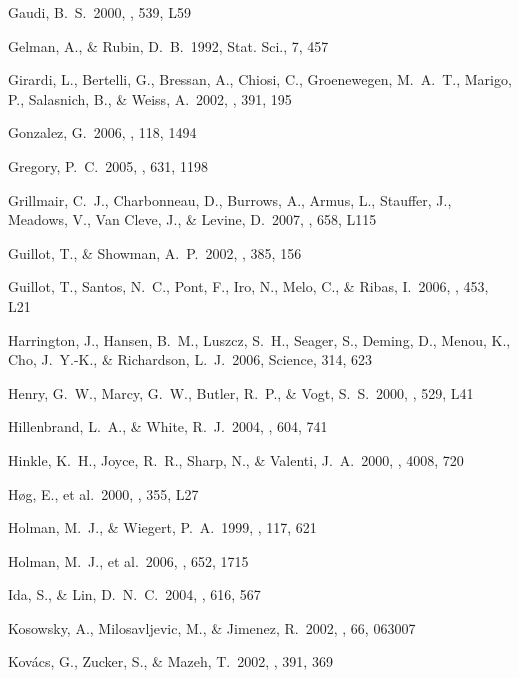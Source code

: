 \documentclass{emulateapj}
\begin{document}
\begin{thebibliography}
 Gaudi, B.~S.\ 2000, \apjl, 539, 
L59

 Gelman, A., \& Rubin, D.~B.\ 1992, Stat. Sci., 7, 457

 Girardi, L., Bertelli, 
G., Bressan, A., Chiosi, C., Groenewegen, M.~A.~T., Marigo, P., Salasnich, 
B., \& Weiss, A.\ 2002, \aap, 391, 195 

 Gonzalez, G.\ 2006, \pasp, 
118, 1494 

 Gregory, P.~C.\ 2005, \apj, 
631, 1198

 Grillmair, C.~J., 
Charbonneau, D., Burrows, A., Armus, L., Stauffer, J., Meadows, V., Van 
Cleve, J., \& Levine, D.\ 2007, \apjl, 658, L115 

 Guillot, T., \& 
Showman, A.~P.\ 2002, \aap, 385, 156 

 Guillot, T., Santos, 
N.~C., Pont, F., Iro, N., Melo, C., \& Ribas, I.\ 2006, \aap, 453, L21

 Harrington, J., 
Hansen, B.~M., Luszcz, S.~H., Seager, S., Deming, D., Menou, K., Cho, 
J.~Y.-K., \& Richardson, L.~J.\ 2006, Science, 314, 623 

 Henry, G.~W., Marcy, 
G.~W., Butler, R.~P., \& Vogt, S.~S.\ 2000, \apjl, 529, L41 

 Hillenbrand, 
L.~A., \& White, R.~J.\ 2004, \apj, 604, 741 

 Hinkle, K.~H., Joyce, 
R.~R., Sharp, N., \& Valenti, J.~A.\ 2000, \procspie, 4008, 720

 H{\o}g, E., et al.\ 
2000, \aap, 355, L27 

 Holman, M.~J., \& 
Wiegert, P.~A.\ 1999, \aj, 117, 621 

 Holman, M.~J., et al.\ 
2006, \apj, 652, 1715 

 Ida, S., \& Lin, D.~N.~C.\ 
2004, \apj, 616, 567 

\bibitem[Kosowsky et al.(2002)]{KOS02} Kosowsky, A., 
Milosavljevic, M., \& Jimenez, R.\ 2002, \prd, 66, 063007

\bibitem[Kov{\'a}cs et al.(2002)]{KOV02} Kov{\'a}cs, G., 
Zucker, S., \& Mazeh, T.\ 2002, \aap, 391, 369 


\end{thebibliography}
\end{document}
